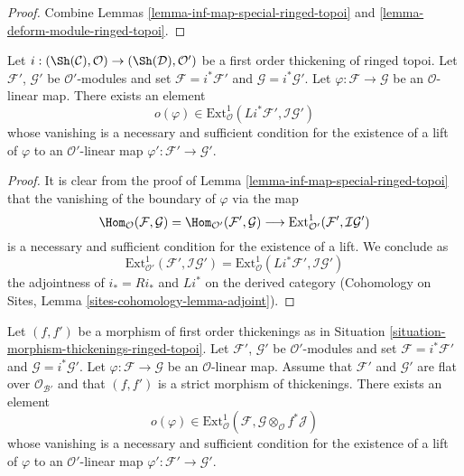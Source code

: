 \begin{proof}
Combine Lemmas \ref{lemma-inf-map-special-ringed-topoi} and
\ref{lemma-deform-module-ringed-topoi}.
\end{proof}

\begin{lemma}
\label{lemma-inf-obs-map-special-ringed-topoi}
Let $i : (\Sh(\mathcal{C}), \mathcal{O}) \to (\Sh(\mathcal{D}), \mathcal{O}')$
be a first order thickening of ringed topoi.
Let $\mathcal{F}'$, $\mathcal{G}'$ be $\mathcal{O}'$-modules and set
$\mathcal{F} = i^*\mathcal{F}'$ and $\mathcal{G} = i^*\mathcal{G}'$.
Let $\varphi : \mathcal{F} \to \mathcal{G}$ be an $\mathcal{O}$-linear map.
There exists an element
$$
o(\varphi) \in
\text{Ext}^1_\mathcal{O}(Li^*\mathcal{F}', \mathcal{I}\mathcal{G}')
$$
whose vanishing is a necessary and sufficient condition for the
existence of a lift of $\varphi$ to an $\mathcal{O}'$-linear map
$\varphi' : \mathcal{F}' \to \mathcal{G}'$.
\end{lemma}

\begin{proof}
It is clear from the proof of Lemma \ref{lemma-inf-map-special-ringed-topoi}
that the vanishing of the boundary of $\varphi$ via the map
$$
\Hom_\mathcal{O}(\mathcal{F}, \mathcal{G}) =
\Hom_{\mathcal{O}'}(\mathcal{F}', \mathcal{G}) \longrightarrow
\text{Ext}^1_{\mathcal{O}'}(\mathcal{F}', \mathcal{I}\mathcal{G}')
$$
is a necessary and sufficient condition for the existence of a lift. We
conclude as
$$
\text{Ext}^1_{\mathcal{O}'}(\mathcal{F}', \mathcal{I}\mathcal{G}') =
\text{Ext}^1_\mathcal{O}(Li^*\mathcal{F}', \mathcal{I}\mathcal{G}')
$$
the adjointness of $i_* = Ri_*$ and $Li^*$ on the derived category
(Cohomology on Sites, Lemma \ref{sites-cohomology-lemma-adjoint}).
\end{proof}

\begin{lemma}
\label{lemma-inf-obs-map-rel-ringed-topoi}
Let $(f, f')$ be a morphism of first order thickenings as in
Situation \ref{situation-morphism-thickenings-ringed-topoi}.
Let $\mathcal{F}'$, $\mathcal{G}'$ be $\mathcal{O}'$-modules and set
$\mathcal{F} = i^*\mathcal{F}'$ and $\mathcal{G} = i^*\mathcal{G}'$.
Let $\varphi : \mathcal{F} \to \mathcal{G}$ be an $\mathcal{O}$-linear map.
Assume that $\mathcal{F}'$ and $\mathcal{G}'$ are flat over
$\mathcal{O}_{\mathcal{B}'}$ and
that $(f, f')$ is a strict morphism of thickenings. There exists an element
$$
o(\varphi) \in
\text{Ext}^1_\mathcal{O}(\mathcal{F},
\mathcal{G} \otimes_\mathcal{O} f^*\mathcal{J})
$$
whose vanishing is a necessary and sufficient condition for the
existence of a lift of $\varphi$ to an $\mathcal{O}'$-linear map
$\varphi' : \mathcal{F}' \to \mathcal{G}'$.
\end{lemma}

